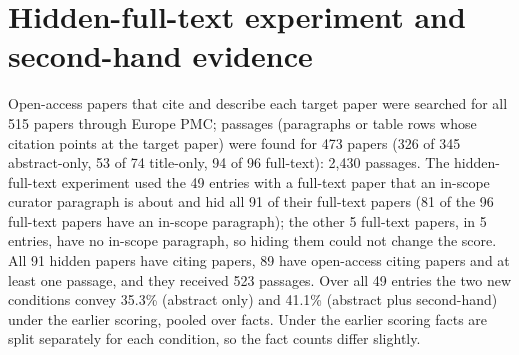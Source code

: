 \documentclass{article} %
\begin{document}
\FloatBarrier
\section{Hidden-full-text experiment and second-hand evidence}
\label{app:hidden}
Open-access papers that cite and describe each target paper were searched for all 515 papers through Europe PMC; passages (paragraphs or table rows whose citation points at the target paper) were found for 473 papers (326 of 345 abstract-only, 53 of 74 title-only, 94 of 96 full-text): 2,430 passages. The hidden-full-text experiment used the 49 entries with a full-text paper that an in-scope curator paragraph is about and hid all 91 of their full-text papers (81 of the 96 full-text papers have an in-scope paragraph); the other 5 full-text papers, in 5 entries, have no in-scope paragraph, so hiding them could not change the score. All 91 hidden papers have citing papers, 89 have open-access citing papers and at least one passage, and they received 523 passages. Over all 49 entries the two new conditions convey 35.3\% (abstract only) and 41.1\% (abstract plus second-hand) under the earlier scoring, pooled over facts. Under the earlier scoring facts are split separately for each condition, so the fact counts differ slightly.
\end{document}
